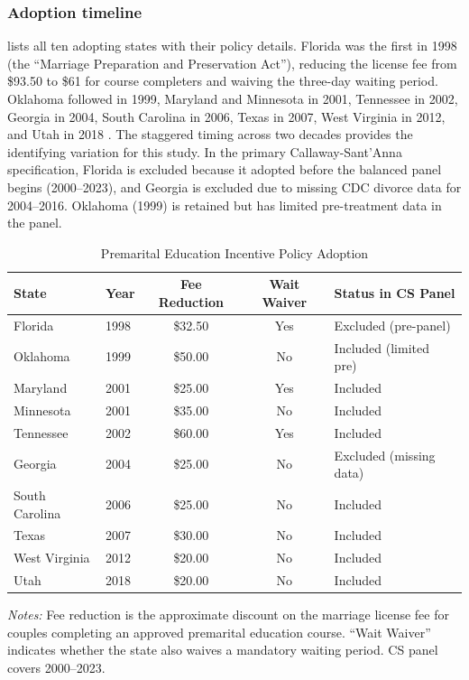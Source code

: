 \documentclass[12pt]{article}
\begin{document}
\subsubsection*{Adoption timeline}  lists all ten adopting states with their policy details. Florida was the first in 1998 (the ``Marriage Preparation and Preservation Act''), reducing the license fee from \$93.50 to \$61 for course completers and waiving the three-day waiting period. Oklahoma followed in 1999, Maryland and Minnesota in 2001, Tennessee in 2002, Georgia in 2004, South Carolina in 2006, Texas in 2007, West Virginia in 2012, and Utah in 2018 \citep{nccsl2023premarital}. The staggered timing across two decades provides the identifying variation for this study. In the primary Callaway-Sant'Anna specification, Florida is excluded because it adopted before the balanced panel begins (2000--2023), and Georgia is excluded due to missing CDC divorce data for 2004--2016. Oklahoma (1999) is retained but has limited pre-treatment data in the panel.

\begin{table}[H]
\centering
\caption{Premarital Education Incentive Policy Adoption}
\label{tab:adoption}
\begin{threeparttable}
\begin{tabular}{llccl}
\toprule
State & Year & Fee Reduction & Wait Waiver & Status in CS Panel \\
\midrule
Florida & 1998 & \$32.50 & Yes & Excluded (pre-panel) \\
Oklahoma & 1999 & \$50.00 & No & Included (limited pre) \\
Maryland & 2001 & \$25.00 & Yes & Included \\
Minnesota & 2001 & \$35.00 & No & Included \\
Tennessee & 2002 & \$60.00 & Yes & Included \\
Georgia & 2004 & \$25.00 & No & Excluded (missing data) \\
South Carolina & 2006 & \$25.00 & No & Included \\
Texas & 2007 & \$30.00 & No & Included \\
West Virginia & 2012 & \$20.00 & No & Included \\
Utah & 2018 & \$20.00 & No & Included \\
\bottomrule
\end{tabular}
\begin{tablenotes}[flushleft]
\small
\item \textit{Notes:} Fee reduction is the approximate discount on the marriage license fee for couples completing an approved premarital education course. ``Wait Waiver'' indicates whether the state also waives a mandatory waiting period. CS panel covers 2000--2023.
\end{tablenotes}
\end{threeparttable}
\end{table}
\end{document}

